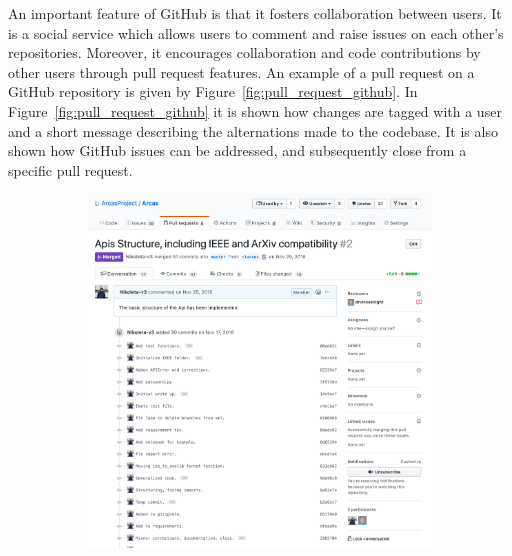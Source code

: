 An important feature of GitHub is that it fosters collaboration between users.
It is a social service which allows users to comment and raise issues on each
other's repositories. Moreover, it encourages collaboration and code contributions
by other users through pull request features. An example of a pull request on
a GitHub repository is given by Figure~\ref{fig:pull_request_github}. In Figure~\ref{fig:pull_request_github}
it is shown how changes are tagged with a user and a short message describing
the alternations made to the codebase. It is also shown how GitHub issues can be
addressed, and subsequently close from a specific pull request.

\begin{figure}[!htbp]
\begin{subfigure}{0.495\textwidth}
    \centering
    \includegraphics[width=\textwidth]{src/chapters/01/img/GitHub_discussion}
\end{subfigure}
\begin{subfigure}{0.495\textwidth}
    \centering

\end{subfigure}
\end{figure}
